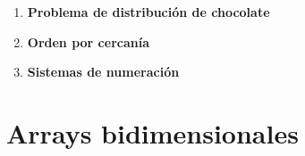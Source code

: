 \begin{enumerate}
    \item \textbf{Problema de distribución de chocolate}\\
    

    \item \textbf{Orden por cercanía}\\
    

    \item \textbf{Sistemas de numeración}\\
    
\end{enumerate}

\newpage
\section{Arrays bidimensionales}
